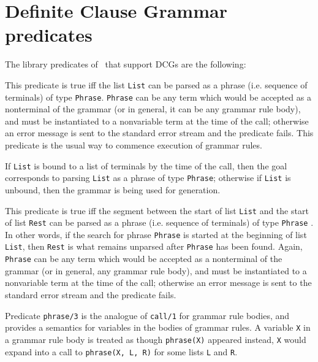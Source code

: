 \section{Definite Clause Grammar predicates} \label{DCG_builtins}
The library predicates of \ourprolog\ that support DCGs are the following:

\begin{description}

    This predicate is true iff the list {\tt List} can be parsed as a phrase 
    (i.e. sequence of terminals) of type {\tt Phrase}.  {\tt Phrase} can be 
    any term which would
    be accepted as a nonterminal of the grammar (or in general, it can 
    be any  grammar rule body), and must be instantiated to a
    nonvariable term  at the time of the call; otherwise an error
    message is sent to the standard error stream and the predicate fails. 
    This predicate is the usual way to commence execution of grammar rules.

    If {\tt List} is bound to a list of terminals by the time of the call,
    then the goal corresponds to parsing {\tt List} as a phrase of type
    {\tt Phrase}; otherwise if {\tt List} is unbound, then the grammar
    is being used for generation.

    This predicate is true iff the segment between the start of list 
    {\tt List} and the start of list {\tt Rest} can be parsed as a phrase 
    (i.e. sequence of terminals) of type {\tt Phrase} . In other words, if 
    the search for phrase 
    {\tt Phrase} is started at the beginning of list {\tt List}, then 
    {\tt Rest} is what remains unparsed after {\tt Phrase} has been
    found. Again, {\tt Phrase} can be any term which
    would be accepted as a nonterminal of the grammar (or in general, any
    grammar rule body), and must be instantiated to a nonvariable term
    at the time of the call; otherwise an error message is sent to the
    standard error stream and the predicate fails.

    Predicate {\tt phrase/3} is the analogue of {\tt call/1} for grammar
    rule bodies, and provides a semantics for variables in the bodies of
    grammar rules.  A variable {\tt X} in a grammar rule body is treated
    as though {\tt phrase(X)} appeared instead, {\tt X} would expand into 
    a call to {\tt phrase(X, L, R)} for some lists {\tt L} and {\tt R}.  


\end{description}
